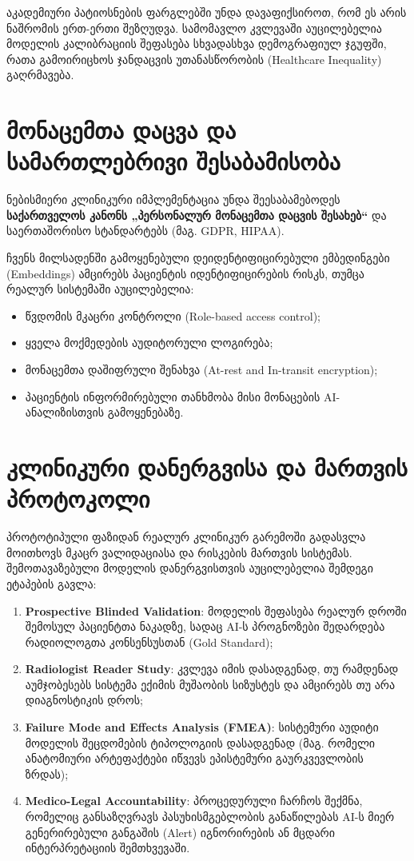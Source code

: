 \documentclass[12pt,a4paper,oneside]{report}
\begin{document}
აკადემიური პატიოსნების ფარგლებში უნდა დავაფიქსიროთ, რომ ეს არის ნაშრომის ერთ-ერთი შეზღუდვა. სამომავლო კვლევაში აუცილებელია მოდელის კალიბრაციის შეფასება სხვადასხვა დემოგრაფიულ ჯგუფში, რათა გამოირიცხოს ჯანდაცვის უთანასწორობის (Healthcare Inequality) გაღრმავება.

\section{მონაცემთა დაცვა და სამართლებრივი შესაბამისობა}
ნებისმიერი კლინიკური იმპლემენტაცია უნდა შეესაბამებოდეს \textbf{საქართველოს კანონს „პერსონალურ მონაცემთა დაცვის შესახებ“} და საერთაშორისო სტანდარტებს (მაგ. GDPR, HIPAA). 

ჩვენს მილსადენში გამოყენებული დეიდენტიფიცირებული ემბედინგები (Embeddings) ამცირებს პაციენტის იდენტიფიცირების რისკს, თუმცა რეალურ სისტემაში აუცილებელია:
\begin{itemize}
    \item წვდომის მკაცრი კონტროლი (Role-based access control);
    \item ყველა მოქმედების აუდიტორული ლოგირება;
    \item მონაცემთა დაშიფრული შენახვა (At-rest and In-transit encryption);
    \item პაციენტის ინფორმირებული თანხმობა მისი მონაცების AI-ანალიზისთვის გამოყენებაზე.
\end{itemize}
\section{კლინიკური დანერგვისა და მართვის პროტოკოლი}
პროტოტიპული ფაზიდან რეალურ კლინიკურ გარემოში გადასვლა მოითხოვს მკაცრ ვალიდაციასა და რისკების მართვის სისტემას. შემოთავაზებული მოდელის დანერგვისთვის აუცილებელია შემდეგი ეტაპების გავლა:
\begin{enumerate}[leftmargin=1.6em]
    \item \textbf{Prospective Blinded Validation}: მოდელის შეფასება რეალურ დროში შემოსულ პაციენტთა ნაკადზე, სადაც AI-ს პროგნოზები შედარდება რადიოლოგთა კონსენსუსთან (Gold Standard);
    \item \textbf{Radiologist Reader Study}: კვლევა იმის დასადგენად, თუ რამდენად აუმჯობესებს სისტემა ექიმის მუშაობის სიზუსტეს და ამცირებს თუ არა დიაგნოსტიკის დროს;
    \item \textbf{Failure Mode and Effects Analysis (FMEA)}: სისტემური აუდიტი მოდელის შეცდომების ტიპოლოგიის დასადგენად (მაგ. რომელი ანატომიური არტეფაქტები იწვევს ეპისტემური გაურკვევლობის ზრდას);
    \item \textbf{Medico-Legal Accountability}: პროცედურული ჩარჩოს შექმნა, რომელიც განსაზღვრავს პასუხისმგებლობის განაწილებას AI-ს მიერ გენერირებული განგაშის (Alert) იგნორირების ან მცდარი ინტერპრეტაციის შემთხვევაში.
\end{enumerate}
\end{document}
